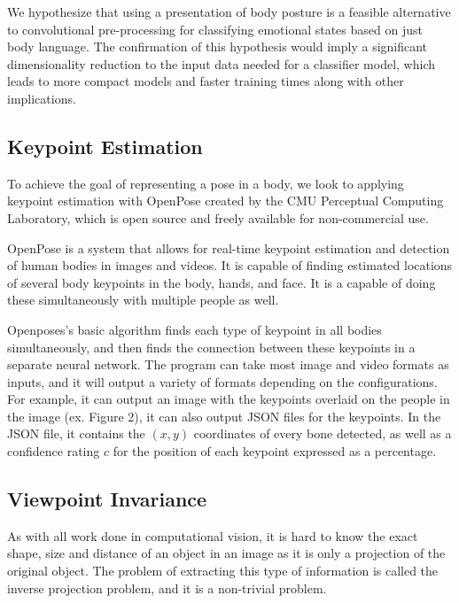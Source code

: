 \documentclass{article}
\begin{document}
We hypothesize that using a presentation of body posture is a feasible alternative to convolutional pre-processing for classifying emotional states based on just body language. The confirmation of this hypothesis would imply a significant dimensionality reduction to the input data needed for a classifier model, which leads to more compact models and faster training times along with other implications.

\subsection{Keypoint Estimation}

To achieve the goal of representing a pose in a body, we look to applying keypoint estimation with OpenPose \citep{cao2017realtime} \citep{simon2017hand} \citep{wei2016cpm} created by the CMU Perceptual Computing Laboratory, which is open source and freely available for non-commercial use. 

OpenPose is a system that allows for real-time keypoint estimation and detection of human bodies in images and videos. It is capable of finding estimated locations of several body keypoints in the body, hands, and face. It is a capable of doing these simultaneously with multiple people as well. 

Openposes’s	 basic algorithm finds each type of keypoint in all bodies simultaneously, and then finds the connection between these keypoints in a separate neural network. The program can take most image and video formats as inputs, and it will output a variety of formats depending on the configurations. For example, it can output an image with the keypoints overlaid on the people in the image (ex. Figure 2), it can also output JSON files for the keypoints. In the JSON file, it contains the $(x,y)$ coordinates of every bone detected, as well as a confidence rating $c$ for the position of each keypoint expressed as a percentage.

\subsection{Viewpoint Invariance}

As with all work done in computational vision, it is hard to know the exact shape, size and distance of an object in an image as it is only a projection of the original object. The problem of extracting this type of information is called the inverse projection problem, and it is a non-trivial problem.
\end{document}
